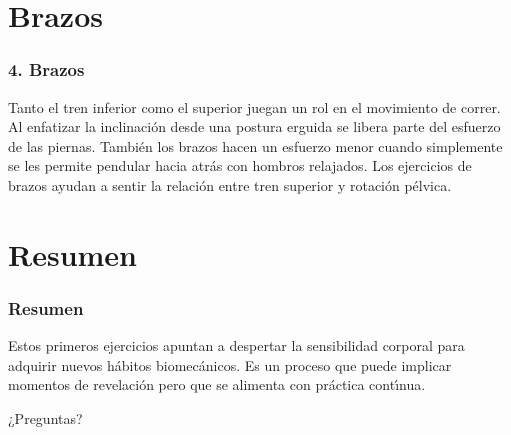 \documentclass{beamer}
\begin{document}
\section{Brazos}
\begin{frame}
\frametitle{4. Brazos}
Tanto el tren inferior como el superior juegan un rol en el  
movimiento de correr. Al enfatizar la inclinación desde una
postura erguida se libera parte del esfuerzo de las piernas.
También los brazos hacen un esfuerzo menor cuando
simplemente se les permite pendular hacia atrás con
hombros relajados. Los ejercicios de brazos ayudan a sentir
la relación entre tren superior y rotación pélvica.
\end{frame}

\section{Resumen}
\begin{frame}
\frametitle{Resumen}
Estos primeros ejercicios apuntan a despertar la sensibilidad
 corporal para adquirir nuevos hábitos biomecánicos. Es un
 proceso que puede implicar momentos de revelación pero
 que se alimenta con práctica contı́nua.
\end{frame}


\begin{frame}
\Huge{\centerline{¿Preguntas?}}
\end{frame}

\end{document}
